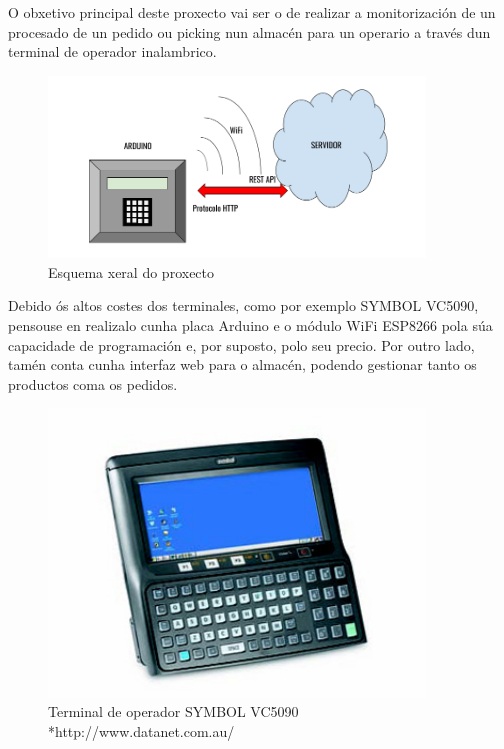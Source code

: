 \documentclass[11pt,twoside]{book}
\begin{document}
O obxetivo principal deste proxecto vai ser o de realizar a monitorización de un procesado de un pedido ou picking nun almacén para un operario a través dun terminal de operador inalambrico.

\begin{figure}[H]
	\begin{center}
		\includegraphics[width=10cm]{images/esquema_xeral.png}
	\end{center}
	\caption{Esquema xeral do proxecto}
	\label{fig:IoT}
\end{figure}

Debido ós altos costes dos terminales, como por exemplo SYMBOL VC5090, pensouse en realizalo cunha placa Arduino e o módulo WiFi ESP8266 pola súa capacidade de programación e, por suposto, polo seu precio.
Por outro lado, tamén conta cunha interfaz web para o almacén, podendo gestionar tanto os productos coma os pedidos.

\begin{figure}[H]
	\begin{center}
		\includegraphics[width=10cm]{images/symbol_VC5090.jpg}
	\end{center}
	\caption{Terminal de operador SYMBOL VC5090 *http://www.datanet.com.au/}
	\label{fig:IoT}
\end{figure}
\end{document}
